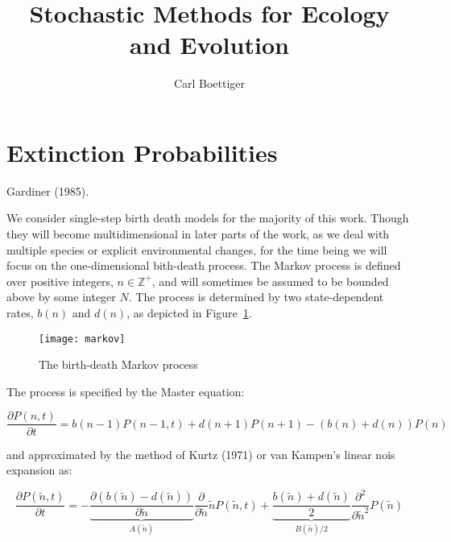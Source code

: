 \documentclass[letterpaper,10pt]{article}
\title{Stochastic Methods for Ecology and Evolution}
\author{Carl Boettiger}
\begin{document}
\maketitle



\section{Extinction Probabilities}

Gardiner (1985).  

We consider single-step birth death models for the majority of this work.  Though they will become multidimensional in later parts of the work, as we deal with multiple species or explicit environmental changes, for the time being we will focus on the one-dimensional bith-death process.  The Markov process is defined over positive integers, $n \in \mathbb{Z}^+$, and will sometimes be assumed to be bounded above by some integer $N$.  The process is determined by two state-dependent rates, $b(n)$ and $d(n)$, as depicted in Figure~\ref{fig:markov}.  

\begin{figure}[h]
\begin{center}
\texttt{[image: markov]}
\end{center}
\caption{The birth-death Markov process}
\label{fig:markov}
\end{figure}

The process is specified by the Master equation:

\begin{equation}
\frac{\partial P(n,t)}{\partial t} = b(n-1)P(n-1,t)+d(n+1)P(n+1) - \left( b(n) + d(n)  \right) P(n)
\label{mastereq}
\end{equation}

and approximated by the method of Kurtz (1971) or van Kampen's linear nois expansion as:

\begin{equation}
\frac{\partial P(\tilde n,t)}{\partial t} = - \underbrace{\frac{\partial \left( b(\tilde n)-d(\tilde n) \right)}{\partial \tilde n}}_{A(\tilde n) } \frac{\partial}{\partial \tilde n} \tilde n  P(\tilde n,t)+ \underbrace{\frac{b(\tilde n)+ d(\tilde n)}{2} }_{B(\tilde n)/2} \frac{\partial^2}{\partial \tilde n^2} P(\tilde n)
\label{forward}
\end{equation}
\end{document}
